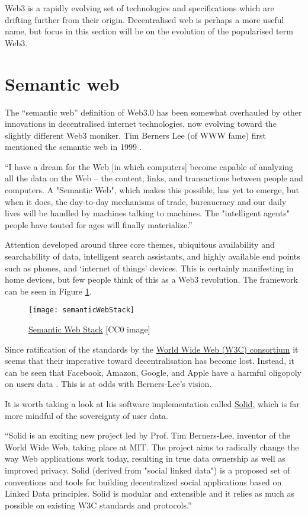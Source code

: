 Web3 is a rapidly evolving set of technologies and specifications which are drifting further from their origin. Decentralised web is perhaps a more useful name, but focus in this section will be on the evolution of the popularised term Web3. 
\section{Semantic web}
The ``semantic web'' definition of Web3.0 has been somewhat overhauled by other innovations in decentralised internet technologies, now evolving toward the slightly different Web3 moniker. Tim Berners Lee (of WWW fame) first mentioned the semantic web in 1999 \cite{semanticWeb}.\par
``I have a dream for the Web [in which computers] become capable of analyzing all the data on the Web – the content, links, and transactions between people and computers. A "Semantic Web", which makes this possible, has yet to emerge, but when it does, the day-to-day mechanisms of trade, bureaucracy and our daily lives will be handled by machines talking to machines. The "intelligent agents" people have touted for ages will finally materialize.''\par
Attention developed around three core themes, ubiquitous availability and searchability of data, intelligent search assistants, and highly available end points such as phones, and `internet of things' devices. This is certainly manifesting in home devices, but few people think of this as a Web3 revolution. The framework can be seen in Figure \ref{fig:semanticWebStack}.\par
\begin{figure}
  \centering
    \texttt{[image: semanticWebStack]}
  \caption{\href{https://en.wikipedia.org/wiki/Semantic_Web_Stack}{Semantic Web Stack} [CC0 image]}
  \label{fig:semanticWebStack}
\end{figure}
Since ratification of the standards by the \href{https://www.w3.org/standards/semanticweb/}{World Wide Web (W3C) consortium} it seems that their imperative toward decentralisation has become lost. Instead, it can be seen that Facebook, Amazon, Google, and Apple have a harmful oligopoly on users data \cite{costigan2018world}. This is at odds with Berners-Lee's vision. \par
It is worth taking a look at his software implementation called \href{https://solidproject.org}{Solid}, which is far more mindful of the sovereignty of user data.\par
``Solid is an exciting new project led by Prof. Tim Berners-Lee, inventor of the World Wide Web, taking place at MIT. The project aims to radically change the way Web applications work today, resulting in true data ownership as well as improved privacy. Solid (derived from "social linked data") is a proposed set of conventions and tools for building decentralized social applications based on Linked Data principles. Solid is modular and extensible and it relies as much as possible on existing W3C standards and protocols.'' \par

